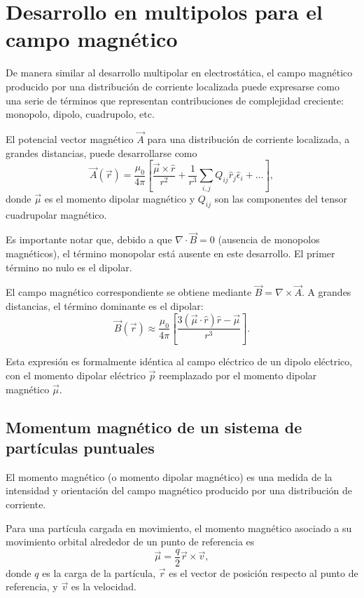 \documentclass[12pt,a4paper]{book}
\begin{document}
\section{Desarrollo en multipolos para el campo magnético}

De manera similar al desarrollo multipolar en electrostática, el campo magnético producido por una distribución de corriente localizada puede expresarse como una serie de términos que representan contribuciones de complejidad creciente: monopolo, dipolo, cuadrupolo, etc.

El potencial vector magnético $\vec{A}$ para una distribución de corriente localizada, a grandes distancias, puede desarrollarse como
\begin{equation}
\vec{A}(\vec{r}) = \frac{\mu_0}{4\pi} \left[ \frac{\vec{\mu} \times \hat{r}}{r^2} + \frac{1}{r^3} \sum_{i,j} Q_{ij} \hat{r}_j \hat{\epsilon}_i + \ldots \right],
\end{equation}
donde $\vec{\mu}$ es el momento dipolar magnético y $Q_{ij}$ son las componentes del tensor cuadrupolar magnético.

Es importante notar que, debido a que $\nabla \cdot \vec{B} = 0$ (ausencia de monopolos magnéticos), el término monopolar está ausente en este desarrollo. El primer término no nulo es el dipolar.

El campo magnético correspondiente se obtiene mediante $\vec{B} = \nabla \times \vec{A}$. A grandes distancias, el término dominante es el dipolar:
\begin{equation}
\vec{B}(\vec{r}) \approx \frac{\mu_0}{4\pi} \left[ \frac{3(\vec{\mu} \cdot \hat{r})\hat{r} - \vec{\mu}}{r^3} \right].
\end{equation}

Esta expresión es formalmente idéntica al campo eléctrico de un dipolo eléctrico, con el momento dipolar eléctrico $\vec{p}$ reemplazado por el momento dipolar magnético $\vec{\mu}$.

\subsection{Momentum magnético de un sistema de partículas puntuales}

El momento magnético (o momento dipolar magnético) es una medida de la intensidad y orientación del campo magnético producido por una distribución de corriente.

Para una partícula cargada en movimiento, el momento magnético asociado a su movimiento orbital alrededor de un punto de referencia es
\begin{equation}
\vec{\mu} = \frac{q}{2} \vec{r} \times \vec{v},
\end{equation}
donde $q$ es la carga de la partícula, $\vec{r}$ es el vector de posición respecto al punto de referencia, y $\vec{v}$ es la velocidad.
\end{document}
